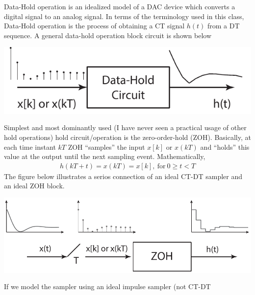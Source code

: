 \documentclass[twoside]{article}
\begin{document}
Data-Hold operation is an idealized model of
a DAC device which converts a digital signal 
to an analog signal. In terms of the terminology used 
in this class, Data-Hold operation is the process of 
obtaining a CT signal $h(t)$ from a DT sequence.
A general data-hold operation block circuit is shown 
below
%
    \begin{center}
\begin{minipage}[h]{0.5\linewidth}
    \begin{center}
      \includegraphics[width=\textwidth]{holdgeneral}
    \end{center}
\end{minipage}
    \end{center}
%
Simplest and most dominantly used (I have never seen a practical
usage of other hold operations) hold circuit/operation is 
the zero-order-hold (ZOH). Basically, at each time instant $k T$
ZOH ``samples'' the input $x[k]$ or $x(kT)$ and ``holds'' this value 
at the output until the next sampling event. Mathematically, 
%
\begin{align*}
  h(kT + t) = x(kT) = x[k], \ \mathrm{for} \ 0 \geq t < T 
\end{align*}
%
The figure below illustrates a serios connection of an ideal
CT-DT sampler and an ideal ZOH block. 
%
    \begin{center}
\begin{minipage}[h]{0.7\linewidth}
    \begin{center}
      \includegraphics[width=\textwidth]{zoh1}
    \end{center}
\end{minipage}
    \end{center}
%
If we model the sampler using an ideal impulse sampler (not CT-DT
\end{document}
